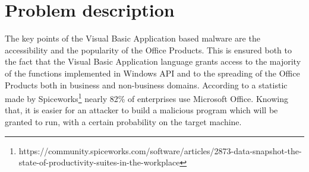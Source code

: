 \section{Problem description}

The key points of the Visual Basic Application based malware are the accessibility and the popularity of the Office Products. This is ensured both to the fact that the Visual Basic Application language grants access to the majority of the functions implemented in Windows API and to the spreading of the Office Products both in business and non-business domains. According to a statistic made by Spiceworks\footnote{https://community.spiceworks.com/software/articles/2873-data-snapshot-the-state-of-productivity-suites-in-the-workplace} nearly 82\% of enterprises use Microsoft Office. Knowing that, it is easier for an attacker to build a malicious program which will be granted to run, with a certain probability on the target machine. 
\par
